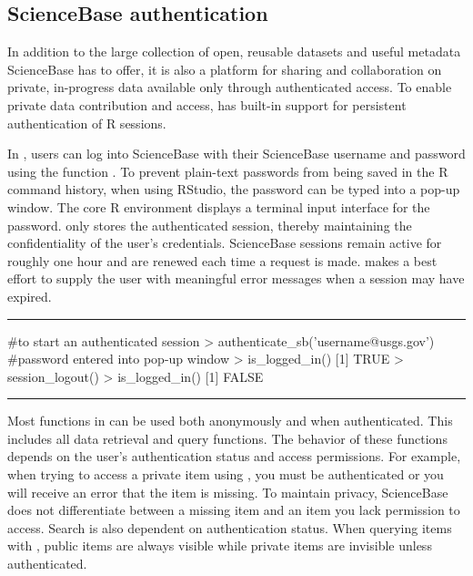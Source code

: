 \subsection{ScienceBase authentication}

In addition to the large collection of open, reusable datasets and
useful metadata ScienceBase has to offer, it is
also a platform for sharing and collaboration on private, in-progress
data available only through authenticated access. To enable
private data contribution and access,
 has built-in support for persistent
authentication of R sessions.

In , users can log into ScienceBase with their ScienceBase username
and password using the function . To prevent plain-text
passwords from being saved in the R command history, when using RStudio, 
the password can be typed into a pop-up window. The core R environment displays a 
terminal input interface for the password.  only stores the authenticated session,
thereby maintaining the confidentiality of the user's credentials. ScienceBase
sessions remain active for roughly one hour and are renewed each time a request
is made.  makes a best effort to supply the user with meaningful
error messages when a session may have expired.

\noindent\rule{\textwidth}{0.4pt}
\begin{example}
#to start an authenticated session
> authenticate_sb('username@usgs.gov') #password entered into pop-up window
> is_logged_in()
[1] TRUE
> session_logout()
> is_logged_in()
[1] FALSE
\end{example}
\noindent\rule{\textwidth}{0.4pt}

Most functions in  can be used both anonymously and when
authenticated. This includes all data retrieval and query functions. The
behavior of these functions depends on the user's authentication status and
access permissions. For example, when trying to access a private item using
, you must be authenticated or you will receive an error that the
item is missing. To maintain privacy, ScienceBase does not differentiate between
a missing item and an item you lack permission to access. Search is also
dependent on authentication status. When querying items with ,
public items are always visible while private items are invisible unless
authenticated.

